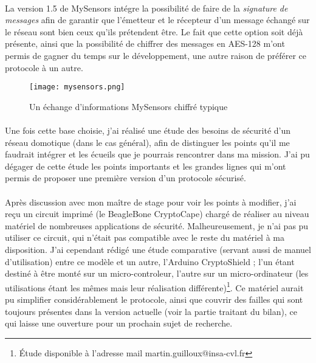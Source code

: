 \documentclass[12 pt]{report}
\begin{document}
\paragraph{}La version 1.5 de MySensors intégre la possibilité de faire de la \emph{signature de messages} afin de garantir que l'émetteur et le récepteur d'un message échangé sur le réseau sont bien ceux qu'ils prétendent être. Le fait que cette option soit déjà présente, ainsi que la possibilité de chiffrer des messages en AES-128 m'ont permis de gagner du temps sur le développement, une autre raison de préférer ce protocole à un autre.


\begin{figure}[h!]
\center
\texttt{[image: mysensors.png]}
\caption{Un échange d'informations MySensors chiffré typique}
\end{figure}

\paragraph{}Une fois cette base choisie, j'ai réalisé une étude des besoins de sécurité d'un réseau domotique (dans le cas général), afin de distinguer les points qu'il me faudrait intégrer et les écueils que je pourrais rencontrer dans ma mission. J'ai pu dégager de cette étude les points importants et les grandes lignes qui m'ont permis de proposer une première version d'un protocole sécurisé.

\paragraph{}Après discussion avec mon maître de stage pour voir les points à modifier, j'ai reçu un circuit imprimé (le BeagleBone CryptoCape) chargé de réaliser au niveau matériel de nombreuses applications de sécurité. Malheureusement, je n'ai pas pu utiliser ce circuit, qui n'était pas compatible avec le reste du matériel à ma disposition. J'ai cependant rédigé une étude comparative (servant aussi de manuel d'utilisation) entre ce modèle et un autre, l'Arduino CryptoShield ; l'un étant destiné à être monté sur un micro-controleur, l'autre sur un micro-ordinateur (les utilisations étant les mêmes mais leur réalisation différente)\footnote{Étude disponible à l'adresse mail martin.guilloux@insa-cvl.fr}. Ce matériel aurait pu simplifier considérablement le protocole, ainsi que couvrir des failles qui sont toujours présentes dans la version actuelle (voir la partie traitant du bilan), ce qui laisse une ouverture pour un prochain sujet de recherche.
\end{document}
